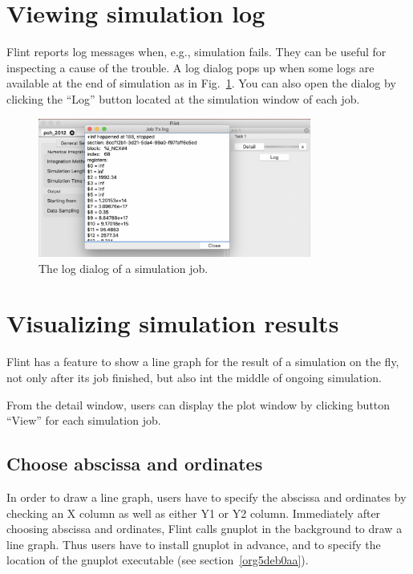 \documentclass[a4paper,10pt]{report}
\begin{document}
\section{Viewing simulation log}
\label{sec:orgb0ecdda}
Flint reports log messages when, e.g., simulation fails.
They can be useful for inspecting a cause of the trouble.
A log dialog pops up when some logs are available at the end of simulation as in Fig.~\ref{fig:org18e1a9d}.
You can also open the dialog by clicking the ``Log'' button located at the simulation window of each job.

\begin{figure}[htbp]
\centering
\includegraphics[width=0.8\textwidth]{image/log.png}
\caption{\label{fig:org18e1a9d}The log dialog of a simulation job.}
\end{figure}

\section{Visualizing simulation results}
\label{sec:org7581a55}
Flint has a feature to show a line graph for the result of a simulation on the
fly, not only after its job finished, but also int the middle of ongoing
simulation.

From the detail window, users can display the plot window by clicking button
``View'' for each simulation job.

\subsection{Choose abscissa and ordinates}
\label{sec:orge97cbcc}
In order to draw a line graph, users have to specify the abscissa and ordinates
by checking an X column as well as either Y1 or Y2 column.
Immediately after choosing abscissa and ordinates, Flint calls gnuplot in the
background to draw a line graph.
Thus users have to install gnuplot in advance, and to specify the location of
the gnuplot executable (see section~\ref{org5deb0aa}).
\end{document}

